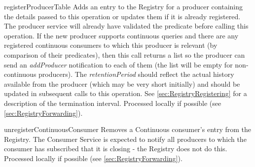 \begin{method}{registerProducerTable}
\desc Adds an entry to the Registry for a producer containing the details passed
to this operation or updates them if it is already registered. The producer
service
will already have validated the predicate before calling this operation.
If the new producer supports continuous queries and there are any registered
continuous consumers to which this producer is relevant (by comparison of
their predicates), then this call returns a list so the producer can
send an \textit{addProducer} notification to each of them (the list will be
empty for non-continuous producers).
The \textit{retentionPeriod} should reflect the actual history
available from the producer (which may be very short initially) and should
be updated in subsequent calls to this operation. See
\ref{sec:RegistryRegistering} for a description of the
termination interval.
Processed locally if possible (see \ref {sec:RegistryForwarding}).
\end{method}

\begin{method}{unregisterContinuousConsumer}
\desc Removes a Continuous consumer's entry from the Registry. The Consumer
Service is expected to notify all producers to which the consumer has subscribed that
it is closing - the Registry does not do this.
Processed locally if possible (see \ref {sec:RegistryForwarding}).
\end{method}

